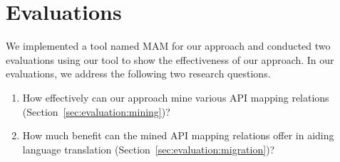 \section{Evaluations}
\label{sec:evaluation}

We implemented a tool named MAM for our approach and
conducted two evaluations using our tool to show the effectiveness
of our approach. In our evaluations, we address the following
two research questions.

\vspace*{-1.5ex}
\begin{enumerate}
\item How effectively can our approach mine various API mapping relations
(Section~\ref{sec:evaluation:mining})? \vspace*{-1.8ex}
\item How much benefit can the mined API mapping relations offer in aiding language
translation (Section~\ref{sec:evaluation:migration})?\vspace*{-1.8ex}
\end{enumerate}%
